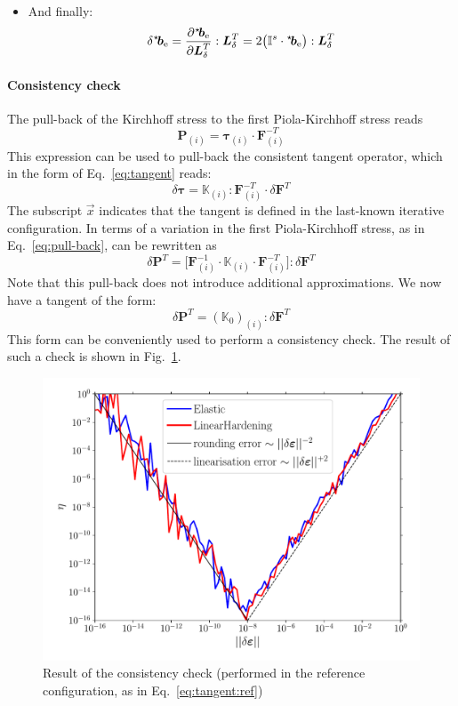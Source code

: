 \documentclass{goose-article}
\newcommand\ST[1]{\hspace*{-.3em}~^\star\!#1}
\newcommand\T[1]{\bm{{#1}}}
\newcommand\TT[1]{\mathbb{{#1}}}
\begin{document}
\begin{itemize}
    \item And finally:
    \begin{equation}
        \delta \ST{\T{b}}_\mathrm{e}
        = \frac{\partial \ST{\T{b}}_\mathrm{e}}{\partial \T{L}_\delta^T} : \T{L}_\delta^T
        = 2 \big( \TT{I}^s \cdot \ST{\T{b}}_\mathrm{e} \big) : \T{L}_\delta^T
    \end{equation}

\end{itemize}


\paragraph{Consistency check}

The pull-back of the Kirchhoff stress to the first Piola-Kirchhoff stress reads
\begin{equation}
    \T{P}_{(i)} = \bm{\tau}_{(i)} \cdot \T{F}^{-T}_{(i)}
\end{equation}
This expression can be used to pull-back the consistent tangent operator,
which in the form of Eq.~\eqref{eq:tangent} reads:
\begin{equation}
    \delta \bm{\tau}
    =
    \TT{K}_{(i)}
    : \T{F}_{(i)}^{-T} \cdot \delta \T{F}^T
    \label{eq:pull-back}
\end{equation}
%
The subscript $\vec{x}$ indicates that the tangent is defined
in the last-known iterative configuration.
In terms of a variation in the first Piola-Kirchhoff stress,
as in Eq.~\eqref{eq:pull-back}, can be rewritten as
%
\begin{equation}
    \delta \T{P}^T
    =
    \big[
    \T{F}_{(i)}^{-1} \cdot
    \TT{K}_{(i)}
    \cdot \T{F}_{(i)}^{-T}
    \big]
    : \delta \T{F}^T
\end{equation}
%
Note that this pull-back does not introduce additional approximations.
We now have a tangent of the form:
\begin{equation}
    \delta \T{P}^T = (\TT{K}_0)_{(i)} : \delta \T{F}^T
    \label{eq:tangent:ref}
\end{equation}
This form can be conveniently used to perform a consistency check.
The result of such a check is shown in Fig.~\ref{fig:consistency}.

\begin{figure}[htp]
    \centering
    \includegraphics[width=.5\textwidth]{examples/consistency}
    \caption{
        Result of the consistency check
        (performed in the reference configuration, as in Eq.~\eqref{eq:tangent:ref})}
    \label{fig:consistency}
\end{figure}


\end{document}
